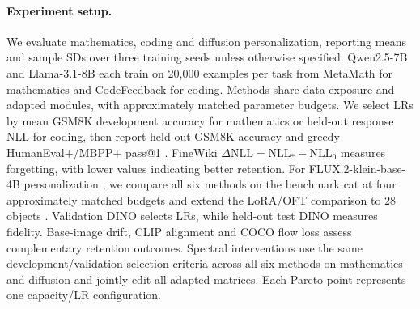 \paragraph{Experiment setup.}
We evaluate mathematics, coding and diffusion personalization, reporting means and sample SDs over three training seeds unless otherwise specified. Qwen2.5-7B \citep{qwen2024model} and Llama-3.1-8B \citep{dubey2024llama3} each train on 20,000 examples per task from MetaMath \citep{yu2024metamath} for mathematics and CodeFeedback \citep{zheng2024opencodeinterpreter} for coding. Methods share data exposure and adapted modules, with approximately matched parameter budgets. We select LRs by mean GSM8K \citep{cobbe2021gsm8k} development accuracy for mathematics or held-out response NLL for coding, then report held-out GSM8K accuracy and greedy HumanEval+/MBPP+ pass@1 \citep{liu2023evalplus}. FineWiki \citep{penedo2025finewiki} $\Delta\mathrm{NLL}=\mathrm{NLL}_*-\mathrm{NLL}_0$ measures forgetting, with lower values indicating better retention. For FLUX.2-klein-base-4B personalization \citep{bfl2026klein}, we compare all six methods on the benchmark cat at four approximately matched budgets and extend the LoRA/OFT comparison to 28 objects \citep{ruiz2023dreambooth}. Validation DINO \citep{oquab2023dinov2} selects LRs, while held-out test DINO measures fidelity. Base-image drift, CLIP alignment \citep{radford2021clip} and COCO flow loss \citep{lin2014coco} assess complementary retention outcomes. Spectral interventions use the same development/validation selection criteria across all six methods on mathematics and diffusion and jointly edit all adapted matrices. Each Pareto point represents one capacity/LR configuration.

